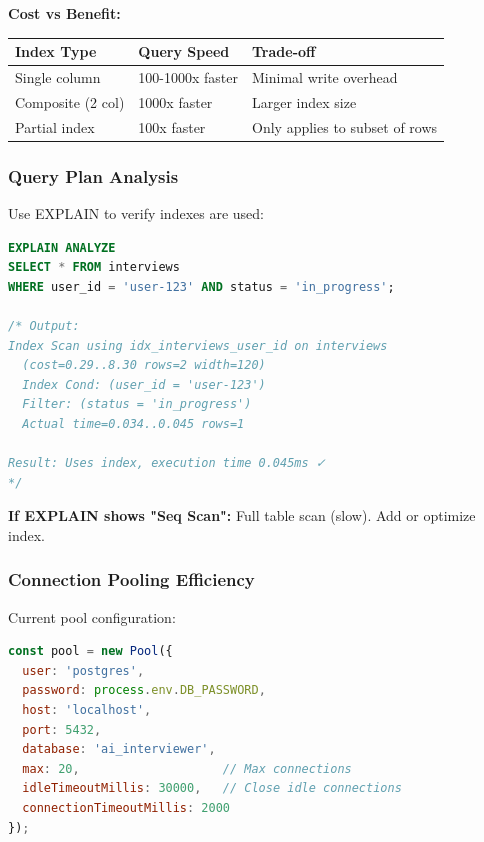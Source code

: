 \documentclass[12pt,a4paper,oneside]{article}
\begin{document}
\textbf{Cost vs Benefit:}

\begin{table}[H]
\centering
\begin{tabular}{|p{3cm}|p{2.5cm}|p{6.5cm}|}
\hline
\textbf{Index Type} & \textbf{Query Speed} & \textbf{Trade-off} \\
\hline
Single column & 100-1000x faster & Minimal write overhead \\
\hline
Composite (2 col) & 1000x faster & Larger index size \\
\hline
Partial index & 100x faster & Only applies to subset of rows \\
\hline
\end{tabular}
\end{table}

\subsubsection{Query Plan Analysis}

Use EXPLAIN to verify indexes are used:

\begin{lstlisting}[language=SQL, caption=EXPLAIN Query Plan]
EXPLAIN ANALYZE
SELECT * FROM interviews 
WHERE user_id = 'user-123' AND status = 'in_progress';

/* Output:
Index Scan using idx_interviews_user_id on interviews 
  (cost=0.29..8.30 rows=2 width=120)
  Index Cond: (user_id = 'user-123')
  Filter: (status = 'in_progress')
  Actual time=0.034..0.045 rows=1

Result: Uses index, execution time 0.045ms ✓
*/
\end{lstlisting}

\textbf{If EXPLAIN shows "Seq Scan":} Full table scan (slow). Add or optimize index.

\subsubsection{Connection Pooling Efficiency}

Current pool configuration:

\begin{lstlisting}[language=JavaScript, caption=PostgreSQL Connection Pool]
const pool = new Pool({
  user: 'postgres',
  password: process.env.DB_PASSWORD,
  host: 'localhost',
  port: 5432,
  database: 'ai_interviewer',
  max: 20,                    // Max connections
  idleTimeoutMillis: 30000,   // Close idle connections
  connectionTimeoutMillis: 2000
});
\end{lstlisting}
\end{document}
